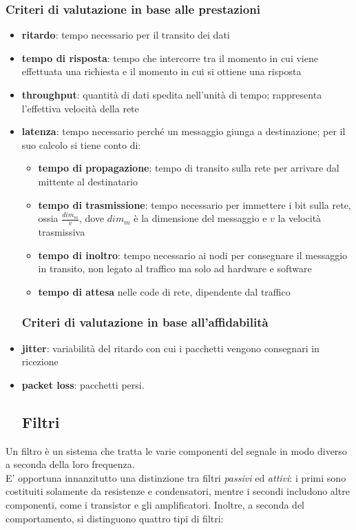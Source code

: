 \documentclass[a4paper,11pt]{article}
\def\sub#1{\subsection{#1}\label{#1}}
\def\subsub#1{\subsubsection{#1}\label{#1}}
\begin{document}
\subsub{Criteri di valutazione in base alle prestazioni}
\begin{itemize}
\item \textbf{ritardo}: tempo necessario per il transito dei dati
\item \textbf{tempo di risposta}: tempo che intercorre tra il momento in cui viene effettuata una richiesta e il momento in cui si ottiene una risposta
\item \textbf{throughput}: quantità di dati spedita nell'unità di tempo; rappresenta l'effettiva velocità della rete
\item \textbf{latenza}: tempo necessario perché un messaggio giunga a destinazione; per il suo calcolo si tiene conto di:
\begin{itemize}
\item \textbf{tempo di propagazione}: tempo di transito sulla rete per arrivare dal mittente al destinatario
\item \textbf{tempo di trasmissione}: tempo necessario per immettere i bit sulla rete, ossia $\frac{dim_{m}}{v}$, dove $dim_{m}$ è la dimensione del messaggio e $v$ la velocità trasmissiva
\item \textbf{tempo di inoltro}: tempo necessario ai nodi per consegnare il messaggio in transito, non legato al traffico ma solo ad hardware e software
\item \textbf{tempo di attesa} nelle code di rete, dipendente dal traffico
\end{itemize}
\subsubsection{Criteri di valutazione in base all'affidabilità}
\item \textbf{jitter}: variabilità del ritardo con cui i pacchetti vengono consegnari in ricezione
\item \textbf{packet loss}: pacchetti persi.

\sub{Filtri}
\end{itemize}
Un filtro è un sistema che tratta le varie componenti del segnale in modo diverso a seconda della loro frequenza.
\\E' opportuna innanzitutto una distinzione tra filtri \textit{passivi} ed \textit{attivi}: i primi sono costituiti solamente da resistenze e condensatori, mentre i secondi includono altre componenti, come i transistor e gli amplificatori. Inoltre, a seconda del comportamento, si distinguono quattro tipi di filtri:
\end{document}

